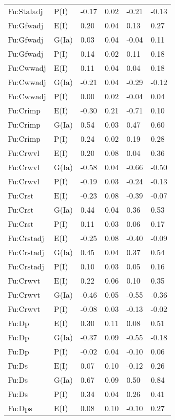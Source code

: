 \begin{center}
\begin{longtable}{|p{1.1in}|p{0.7in}|p{0.7in}|p{0.6in}|p{0.6in}|p{0.6in}|}
  Fu:Staladj & P(I) & -0.17 & 0.02 & -0.21 & -0.13 \\ 
  Fu:Gfwadj & E(I) & 0.20 & 0.04 & 0.13 & 0.27 \\ 
  Fu:Gfwadj & G(Ia) & 0.03 & 0.04 & -0.04 & 0.11 \\ 
  Fu:Gfwadj & P(I) & 0.14 & 0.02 & 0.11 & 0.18 \\ 
  Fu:Cwwadj & E(I) & 0.11 & 0.04 & 0.04 & 0.18 \\ 
  Fu:Cwwadj & G(Ia) & -0.21 & 0.04 & -0.29 & -0.12 \\ 
  Fu:Cwwadj & P(I) & 0.00 & 0.02 & -0.04 & 0.04 \\ 
  Fu:Crimp & E(I) & -0.30 & 0.21 & -0.71 & 0.10 \\ 
  Fu:Crimp & G(Ia) & 0.54 & 0.03 & 0.47 & 0.60 \\ 
  Fu:Crimp & P(I) & 0.24 & 0.02 & 0.19 & 0.28 \\ 
  Fu:Crwvl & E(I) & 0.20 & 0.08 & 0.04 & 0.36 \\ 
  Fu:Crwvl & G(Ia) & -0.58 & 0.04 & -0.66 & -0.50 \\ 
  Fu:Crwvl & P(I) & -0.19 & 0.03 & -0.24 & -0.13 \\ 
  Fu:Crst & E(I) & -0.23 & 0.08 & -0.39 & -0.07 \\ 
  Fu:Crst & G(Ia) & 0.44 & 0.04 & 0.36 & 0.53 \\ 
  Fu:Crst & P(I) & 0.11 & 0.03 & 0.06 & 0.17 \\ 
  Fu:Crstadj & E(I) & -0.25 & 0.08 & -0.40 & -0.09 \\ 
  Fu:Crstadj & G(Ia) & 0.45 & 0.04 & 0.37 & 0.54 \\ 
  Fu:Crstadj & P(I) & 0.10 & 0.03 & 0.05 & 0.16 \\ 
  Fu:Crwvt & E(I) & 0.22 & 0.06 & 0.10 & 0.35 \\ 
  Fu:Crwvt & G(Ia) & -0.46 & 0.05 & -0.55 & -0.36 \\ 
  Fu:Crwvt & P(I) & -0.08 & 0.03 & -0.13 & -0.02 \\ 
  Fu:Dp & E(I) & 0.30 & 0.11 & 0.08 & 0.51 \\ 
  Fu:Dp & G(Ia) & -0.37 & 0.09 & -0.55 & -0.18 \\ 
  Fu:Dp & P(I) & -0.02 & 0.04 & -0.10 & 0.06 \\ 
  Fu:Ds & E(I) & 0.07 & 0.10 & -0.12 & 0.26 \\ 
  Fu:Ds & G(Ia) & 0.67 & 0.09 & 0.50 & 0.84 \\ 
  Fu:Ds & P(I) & 0.34 & 0.04 & 0.26 & 0.41 \\ 
  Fu:Dps & E(I) & 0.08 & 0.10 & -0.10 & 0.27 \\ 

\end{longtable}
\end{center}
